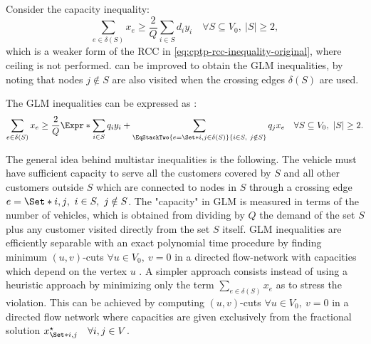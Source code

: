 Consider the capacity inequality:
\begin{equation}
	\label{eq:cptp-weaker-rcc}
	\sum_{e \in \delta(S)} x_e \ge \frac{2}{Q} \sum_{i \in S} d_i y_i \quad \forall S \subseteq V_0,\ |S| \ge 2,
\end{equation}
which is a weaker form of the RCC in \cref{eq:cptp-rcc-inequality-original},
where ceiling is not performed.
 can be improved to obtain the GLM inequalities,
by noting that  nodes $j \notin S$ are also visited when the crossing edges $\delta(S)$ are used.

The GLM inequalities can be expressed as \parencite{jepsen2014}:
\begin{equation}
	\label{eq:cptp-glm-inequality}
	\sum\limits_{e \in \delta(S)} x_e \ge \frac{2}{Q} \Expr*{
		\sum\limits_{i \in S} q_i y_i +
		\sum\limits_{\EqStackTwo{e = \Set*{i, j} \in \delta(S)}{i \in S,\ j \notin S}} q_j x_e
	}
	\quad \forall S \subseteq V_0,\ |S| \ge 2.
\end{equation}

The general idea behind multistar inequalities is the following.
The vehicle must have sufficient capacity to serve
all the customers covered by $S$
and all other customers outside $S$
which are connected to nodes in $S$ through a crossing edge $e = \Set*{i, j},\ i \in S,\ j \notin S$.
The "capacity" in GLM is measured in terms of the number of vehicles,
which is obtained from dividing by $Q$ the demand of the set $S$ plus
any customer visited directly from the set $S$ itself.
GLM inequalities are efficiently separable with
an exact polynomial time procedure by finding minimum
$(u, v)$-cuts $\forall u \in V_0,\ v = 0$
in a directed flow-network with capacities which depend on the vertex $u$
\parencite{letchford2006, jepsen2014}.
A simpler approach consists instead of using a heuristic approach
by minimizing only the term $\sum_{e \in \delta(S)} x_e$ as to stress the violation.
This can be achieved by computing $(u, v)$-cuts $\forall u \in V_0,\ v = 0$
in a directed flow network where capacities are given exclusively from the
fractional solution $x^\star _{\Set*{i, j}}\quad \forall i, j \in V$.
